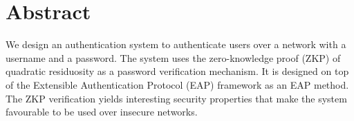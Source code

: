\section*{Abstract} 
We design an authentication system to authenticate users over a network with a username and a password.
The system uses the zero-knowledge proof (ZKP) of quadratic residuosity as a password verification mechanism.
It is designed on top of the Extensible Authentication Protocol (EAP) framework as an EAP method.
The ZKP verification yields interesting security properties that make the system favourable to be used over insecure networks.

\newpage